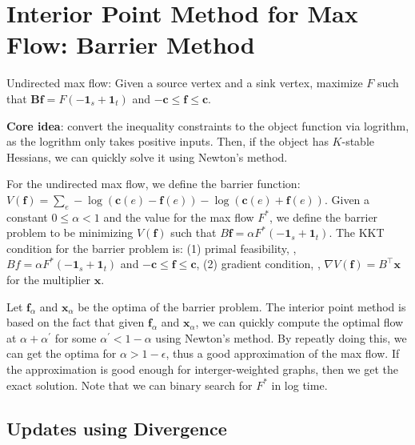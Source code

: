 \section{Interior Point Method for Max Flow: Barrier Method}

Undirected max flow: Given a source vertex and a sink vertex, maximize $F$ such that $\boldsymbol{B}\boldsymbol{f} = F (-\boldsymbol{1}_s + \boldsymbol{1}_t)$ and $-\boldsymbol{c} \le \boldsymbol{f} \le \boldsymbol{c}$.

\textbf{Core idea}: convert the inequality constraints to the object function via logrithm, as the logrithm only takes positive inputs. Then, if the object has $K$-stable Hessians, we can quickly solve it using Newton's method. 

For the undirected max flow, we define the barrier function: $V(\boldsymbol{f})=\sum_{e}-\log (\boldsymbol{c}(e)-\boldsymbol{f}(e))-\log (\boldsymbol{c}(e)+\boldsymbol{f}(e)).$ Given a constant $0\le \alpha <1$ and the value for the max flow $F^*$, we define the barrier problem to be minimizing $V(\boldsymbol{f})$ such that $B\boldsymbol{f} = \alpha F^* (-\boldsymbol{1}_s + \boldsymbol{1}_t)$. The KKT condition for the barrier problem is: (1) primal feasibility, \ie, $Bf = \alpha F^* (-\boldsymbol{1}_s + \boldsymbol{1}_t)$ and $-\boldsymbol{c} \le \boldsymbol{f} \le \boldsymbol{c}$, (2) gradient condition, \ie, $\nabla V(\boldsymbol{f}) = B^\top \boldsymbol{x}$ for the multiplier $\boldsymbol{x}$.

Let $\boldsymbol{f}_\alpha$ and $\boldsymbol{x}_\alpha$ be the optima of the barrier problem. The interior point method is based on the fact that given $\boldsymbol{f}_\alpha$ and $\boldsymbol{x}_\alpha$, we can quickly compute the optimal flow at $\alpha + \alpha^\prime$ for some $\alpha^\prime < 1-\alpha$ using Newton's method. By repeatly doing this, we can get the optima for $\alpha > 1-\epsilon$, thus a good approximation of the max flow. If the approximation is good enough for interger-weighted graphs, then we get the exact solution. Note that we can binary search for $F^*$ in log time.

\subsection{Updates using Divergence}

